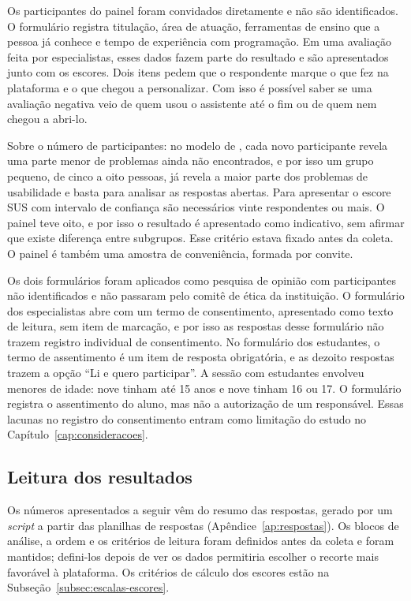 Os participantes do painel foram convidados diretamente e não são identificados. O formulário registra titulação, área de atuação, ferramentas de ensino que a pessoa já conhece e tempo de experiência com programação. Em uma avaliação feita por especialistas, esses dados fazem parte do resultado e são apresentados junto com os escores. Dois itens pedem que o respondente marque o que fez na plataforma e o que chegou a personalizar. Com isso é possível saber se uma avaliação negativa veio de quem usou o assistente até o fim ou de quem nem chegou a abri-lo.

Sobre o número de participantes: no modelo de , cada novo participante revela uma parte menor de problemas ainda não encontrados, e por isso um grupo pequeno, de cinco a oito pessoas, já revela a maior parte dos problemas de usabilidade e basta para analisar as respostas abertas. Para apresentar o escore SUS com intervalo de confiança são necessários vinte respondentes ou mais. O painel teve oito, e por isso o resultado é apresentado como indicativo, sem afirmar que existe diferença entre subgrupos. Esse critério estava fixado antes da coleta. O painel é também uma amostra de conveniência, formada por convite.

Os dois formulários foram aplicados como pesquisa de opinião com participantes não identificados e não passaram pelo comitê de ética da instituição. O formulário dos especialistas abre com um termo de consentimento, apresentado como texto de leitura, sem item de marcação, e por isso as respostas desse formulário não trazem registro individual de consentimento. No formulário dos estudantes, o termo de assentimento é um item de resposta obrigatória, e as dezoito respostas trazem a opção ``Li e quero participar''. A sessão com estudantes envolveu menores de idade: nove tinham até 15 anos e nove tinham 16 ou 17. O formulário registra o assentimento do aluno, mas não a autorização de um responsável. Essas lacunas no registro do consentimento entram como limitação do estudo no Capítulo~\ref{cap:consideracoes}.

\subsection{Leitura dos resultados}
\label{subsec:leitura-resultados}

Os números apresentados a seguir vêm do resumo das respostas, gerado por um \textit{script} a partir das planilhas de respostas (Apêndice~\ref{ap:respostas}). Os blocos de análise, a ordem e os critérios de leitura foram definidos antes da coleta e foram mantidos; defini-los depois de ver os dados permitiria escolher o recorte mais favorável à plataforma. Os critérios de cálculo dos escores estão na Subseção~\ref{subsec:escalas-escores}.

